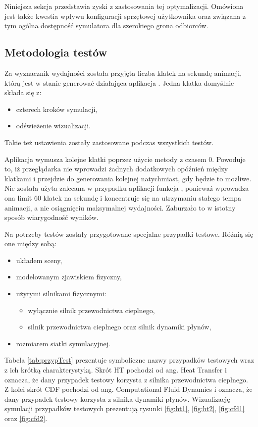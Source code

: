 Niniejsza sekcja przedstawia zyski z zastosowania tej optymalizacji. Omówiona
jest także kwestia wpływu konfiguracji sprzętowej użytkownika oraz związana z
tym ogólna dostępność symulatora dla szerokiego grona odbiorców.

\subsection{Metodologia testów}
\label{sec:metodologiaTestow}

Za wyznacznik wydajności została przyjęta liczba klatek na sekundę animacji,
którą jest w stanie generować działająca aplikacja \en. Jedna klatka domyślnie
składa się z:

\begin{itemize}
\item czterech kroków symulacji, 
\item odświeżenie wizualizacji.
\end{itemize}

Takie też ustawienia zostały zastosowane podczas wszystkich testów. 

Aplikacja wymusza kolejne klatki poprzez użycie metody  z
czasem 0. Powoduje to, iż przeglądarka nie wprowadzi żadnych dodatkowych
opóźnień między klatkami i przejdzie do generowania kolejnej natychmiast, gdy
będzie to możliwe. Nie została użyta zalecana w przypadku aplikacji
funkcja , ponieważ wprowadza ona limit 60
klatek na sekundę i koncentruje się na utrzymaniu stałego tempa animacji, a nie
osiągnięciu maksymalnej wydajności. Zaburzało to w istotny sposób wiarygodność
wyników.

Na potrzeby testów zostały przygotowane specjalne przypadki testowe. Różnią się
one między sobą:
\begin{itemize} 
\item układem sceny, 
\item modelowanym zjawiskiem fizyczny,
\item użytymi silnikami fizycznymi:
	\begin{itemize} 
	\item wyłącznie silnik przewodnictwa cieplnego,
	\item silnik przewodnictwa cieplnego oraz silnik dynamiki płynów,
	\end{itemize}
\item rozmiarem siatki symulacyjnej.
\end{itemize}

Tabela \ref{tab:przypTest} prezentuje symboliczne nazwy przypadków testowych
wraz z ich krótką charakterystyką. Skrót HT pochodzi od ang. Heat Transfer i
oznacza, że dany przypadek testowy korzysta z silnika przewodnictwa cieplnego. Z
kolei skrót CDF pochodzi od ang. Computational Fluid Dynamics i oznacza, że dany
przypadek testowy korzysta z silnika dynamiki płynów. Wizualizację symulacji
przypadków testowych prezentują rysunki \ref{fig:ht1}, \ref{fig:ht2},
\ref{fig:cfd1} oraz \ref{fig:cfd2}.


